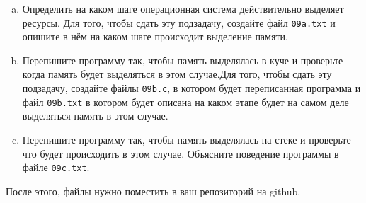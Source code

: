 \documentclass[10pt]{article}
\begin{document}
\begin{enumerate}[a.]
\item Определить на каком шаге операционная система действительно выделяет ресурсы. Для того, чтобы сдать эту подзадачу, создайте файл \texttt{09a.txt} и опишите в нём на каком шаге происходит выделение памяти.
\item Перепишите программу так, чтобы память выделялась в куче и проверьте когда память будет выделяться в этом случае.Для того, чтобы сдать эту подзадачу, создайте файлы \texttt{09b.c}, в котором будет переписанная программа и файл \texttt{09b.txt} в котором будет описана на каком этапе будет на самом деле выделяться память в этом случае.
\item Перепишите программу так, чтобы память выделялась на стеке и проверьте что будет происходить в этом случае. Объясните поведение программы в файле \texttt{09c.txt}.
\end{enumerate}
После этого, файлы нужно поместить в ваш репозиторий на github.
\end{document}
